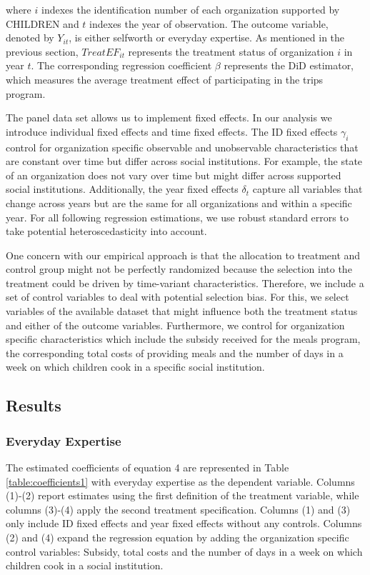 \documentclass[12pt, a4paper, titlepage]{article}\usepackage[]{graphicx}\usepackage[]{color}
\begin{document}
where $i$ indexes the identification number of each organization supported by CHILDREN and $t$ indexes the year of observation. The outcome variable, denoted by $Y_{it}$, is either selfworth or everyday expertise. As mentioned in the previous section, $TreatEF_{it}$ represents the treatment status of organization $i$ in year $t$. The corresponding regression coefficient $\beta$ represents the DiD estimator, which measures the average treatment effect of participating in the trips program.

The panel data set allows us to implement fixed effects. In our analysis we introduce individual fixed effects and time fixed effects. The ID fixed effects $\gamma_{i}$ control for organization specific observable and unobservable characteristics that are constant over time but differ across social institutions. For example, the state of an organization does not vary over time but might differ across supported social institutions. Additionally, the year fixed effects $\delta_{t}$ capture all variables that change across years but are the same for all organizations and within a specific year. For all following regression estimations, we use robust standard errors to take potential heteroscedasticity into account.

One concern with our empirical approach is that the allocation to treatment and control group might not be perfectly randomized because the selection into the treatment could be driven by time-variant characteristics. Therefore, we include a set of control variables to deal with potential selection bias. For this, we select variables of the available dataset that might influence both the treatment status and either of the outcome variables. Furthermore, we control for organization specific characteristics which include the subsidy received for the meals program, the corresponding total costs of providing meals and the number of days in a week on which children cook in a specific social institution.

\subsection{Results}

\subsubsection{Everyday Expertise}

The estimated coefficients of equation 4 are represented in Table \ref{table:coefficients1} with everyday expertise as the dependent variable. Columns (1)-(2) report estimates using the first definition of the treatment variable, while columns (3)-(4) apply the second treatment specification. Columns (1) and (3) only include ID fixed effects and year fixed effects without any controls. Columns (2) and (4) expand the regression equation by adding the organization specific control variables: Subsidy, total costs and the number of days in a week on which children cook in a social institution.
\end{document}
